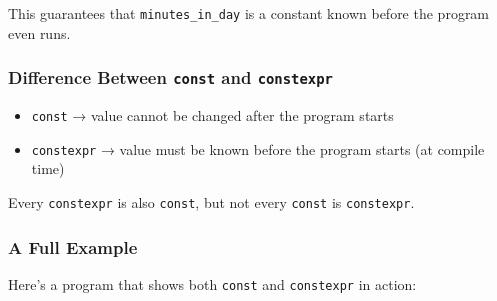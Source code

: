 \documentclass[
  letterpaper,
  DIV=11,
  numbers=noendperiod]{scrreprt}
\providecommand{\tightlist}{%
  \setlength{\itemsep}{0pt}\setlength{\parskip}{0pt}}
\begin{document}
This guarantees that \texttt{minutes\_in\_day} is a constant known
before the program even runs.

\subsubsection{\texorpdfstring{Difference Between \texttt{const} and
\texttt{constexpr}}{Difference Between const and constexpr}}\label{difference-between-const-and-constexpr}

\begin{itemize}
\tightlist
\item
  \texttt{const} → value cannot be changed after the program starts
\item
  \texttt{constexpr} → value must be known before the program starts (at
  compile time)
\end{itemize}

Every \texttt{constexpr} is also \texttt{const}, but not every
\texttt{const} is \texttt{constexpr}.

\subsubsection{A Full Example}\label{a-full-example-2}

Here's a program that shows both \texttt{const} and \texttt{constexpr}
in action:
\end{document}
